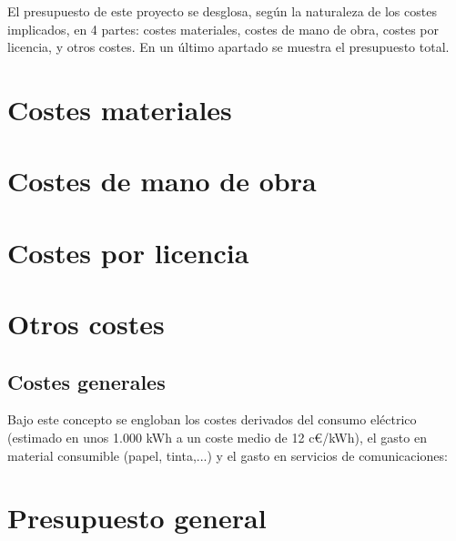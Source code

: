 El presupuesto de este proyecto se desglosa, según la naturaleza de los costes implicados, en 4 partes: costes materiales, costes de mano de obra, costes por licencia, y otros costes. En un último apartado se muestra el presupuesto total.
\section{Costes materiales}
\section{Costes de mano de obra}
\section{Costes por licencia}
\section{Otros costes}
\subsection{Costes generales}
Bajo este concepto se engloban los costes derivados del consumo eléctrico (estimado en unos 1.000 kWh a un coste medio de 12 c\euro/kWh), el gasto en material consumible (papel, tinta,...) y el gasto en servicios de comunicaciones:

\section{Presupuesto general}